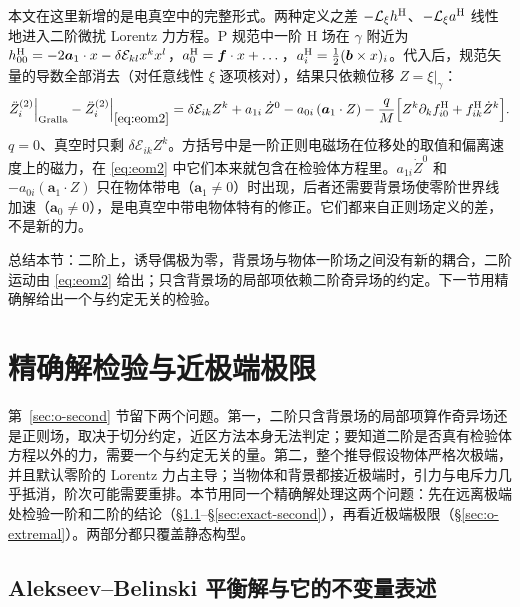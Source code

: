 \documentclass[11pt,a4paper]{ctexart}
\begin{document}
本文在这里新增的是电真空中的完整形式。两种定义之差 $-\mathcal L_\xi h^{\rm H}$、$-\mathcal L_\xi a^{\rm H}$ 线性地进入二阶微扰 Lorentz 力方程。P 规范中一阶 H 场在 $\gamma$ 附近为 $h^{\rm H}_{00}=-2\boldsymbol a_1\cdot x-\delta\mathcal E_{kl}x^kx^l$，$a^{\rm H}_0=\boldsymbol f\cdot x+\dots$，$a^{\rm H}_i=\tfrac12(\boldsymbol b\times x)_i$。代入后，规范矢量的导数全部消去（对任意线性 $\xi$ 逐项核对），结果只依赖位移 $Z=\xi|_\gamma$：
\begin{equation}
\ddot Z^{(2)}_i\Big|_{\rm Gralla}-\ddot Z^{(2)}_i\Big|_{\eqref{eq:eom2}}
=\delta\mathcal E_{ik}Z^k+a_{1i}\,\dot Z^0-a_{0i}\,(\boldsymbol a_1\cdot Z)-\frac qM\Big[Z^k\partial_kf^{\rm H}_{i0}+f^{\rm H}_{ik}\dot Z^k\Big].
\label{eq:ck2C}
\end{equation}
$q=0$、真空时只剩 $\delta\mathcal E_{ik}Z^k$。方括号中是一阶正则电磁场在位移处的取值和偏离速度上的磁力，在 \eqref{eq:eom2} 中它们本来就包含在检验体方程里。$a_{1i}\dot Z^0$ 和 $-a_{0i}(\boldsymbol a_1\cdot Z)$ 只在物体带电（$\boldsymbol a_1\neq0$）时出现，后者还需要背景场使零阶世界线加速（$\boldsymbol a_0\neq0$），是电真空中带电物体特有的修正。它们都来自正则场定义的差，不是新的力。

\medskip
总结本节：二阶上，诱导偶极为零，背景场与物体一阶场之间没有新的耦合，二阶运动由 \eqref{eq:eom2} 给出；只含背景场的局部项依赖二阶奇异场的约定。下一节用精确解给出一个与约定无关的检验。

\section{精确解检验与近极端极限}\label{sec:o-exact}

第~\ref{sec:o-second} 节留下两个问题。第一，二阶只含背景场的局部项算作奇异场还是正则场，取决于切分约定，近区方法本身无法判定；要知道二阶是否真有检验体方程以外的力，需要一个与约定无关的量。第二，整个推导假设物体严格次极端，并且默认零阶的 Lorentz 力占主导；当物体和背景都接近极端时，引力与电斥力几乎抵消，阶次可能需要重排。本节用同一个精确解处理这两个问题：先在远离极端处检验一阶和二阶的结论（\S\ref{sec:exact-AB}--\S\ref{sec:exact-second}），再看近极端极限（\S\ref{sec:o-extremal}）。两部分都只覆盖静态构型。

\subsection{Alekseev--Belinski 平衡解与它的不变量表述}\label{sec:exact-AB}
\end{document}

